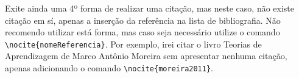 Exite ainda uma 4º forma de realizar uma citação, mas neste caso, não existe citação em sí, apenas a inserção da referência na lista de bibliografia. Não recomendo utilizar está forma, mas caso seja necessário utilize o comando \lstinline|\nocite{nomeReferencia}|. Por exemplo, irei citar o livro Teorias de Aprendizagem de Marco Antônio Moreira sem apresentar nenhuma citação, apenas adicionando o comando \lstinline|\nocite{moreira2011}|. \nocite{moreira2011}

